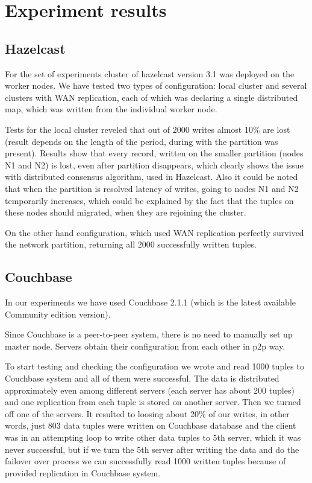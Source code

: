 \documentclass[a4paper]{article}
\begin{document}
\section{Experiment results}

\subsection{Hazelcast}

For the set of experiments cluster of hazelcast version 3.1 was deployed on the worker nodes. 
We have tested two types of configuration: local cluster and several clusters with WAN replication, each of which was declaring a single distributed map, which was written from the individual worker node.

Tests for the local cluster reveled that out of 2000 writes almost 10\% are lost (result depends on the length of the period, during with the partition was present).
Results show that every record, written on the smaller partition (nodes N1 and N2) is lost, even after partition disappears, which clearly shows the issue with distributed consensus algorithm, used in Hazelcast.
Also it could be noted that when the partition is resolved latency of writes, going to nodes N1 and N2 temporarily increases, which could be explained by the fact that the tuples on these nodes should migrated, when they are rejoining the cluster.

On the other hand configuration, which used WAN replication perfectly survived the network partition, returning all 2000 successfully written tuples.

\subsection{Couchbase}

In our experiments we have used Couchbase 2.1.1 (which is the latest available Community edition version).

Since Couchbase is a peer-to-peer system, there is no need to manually set up master node. Servers obtain their configuration from each other in p2p way.

To start testing and checking the configuration we wrote and read 1000 tuples to Couchbase system and all of them were successful. 
The data is distributed approximately even among different servers (each server has about 200 tuples) and one replication from each tuple is stored on another server. 
Then we turned off one of the servers. It resulted to loosing about 20\% of our writes, in other words, just 803 data tuples were written on Couchbase database and the client was in an attempting loop to write other data tuples to 5th server, which it was never successful, but if we turn the 5th server after writing the data and do the failover over process we can successfully read 1000 written tuples because of provided replication in Couchbase system.
\end{document}
